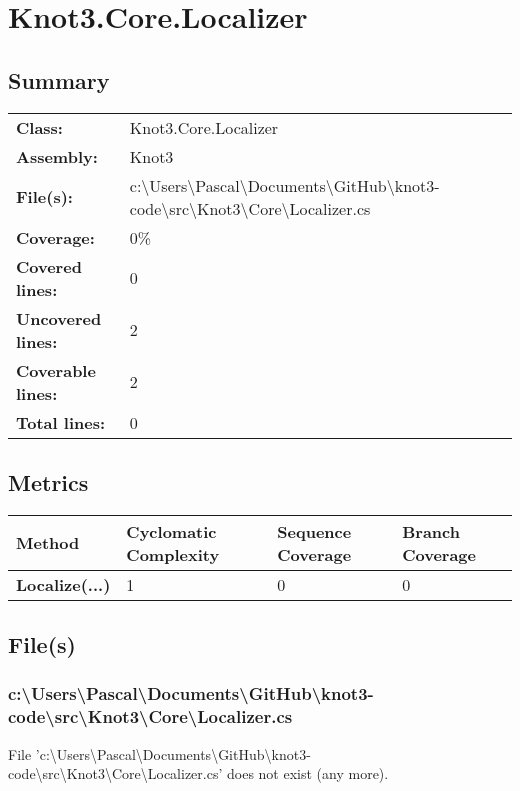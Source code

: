 \documentclass[a4paper,10pt]{article}
\begin{document}
\section{Knot3.Core.Localizer}
\subsection{Summary}
\begin{longtable}[l]{ll}
\textbf{Class:} & Knot3.Core.Localizer\\
\textbf{Assembly:} & Knot3\\
\textbf{File(s):} & \begin{minipage}[t]{12cm}{c:\textbackslash Users\textbackslash Pascal\textbackslash Documents\textbackslash GitHub\textbackslash knot3-code\textbackslash src\textbackslash Knot3\textbackslash Core\textbackslash Localizer.cs}\end{minipage} \\
\textbf{Coverage:} & 0\%\\
\textbf{Covered lines:} & 0\\
\textbf{Uncovered lines:} & 2\\
\textbf{Coverable lines:} & 2\\
\textbf{Total lines:} & 0\\
\end{longtable}
\subsection{Metrics}
\begin{longtable}[l]{|l|l|l|l|}
\hline
\textbf{Method} & \textbf{Cyclomatic Complexity} & \textbf{Sequence Coverage} & \textbf{Branch Coverage}\\
\hline
\textbf{Localize(...)} & 1 & 0 & 0\\
\hline
\end{longtable}
\subsection{File(s)}
\subsubsection{c:\textbackslash Users\textbackslash Pascal\textbackslash Documents\textbackslash GitHub\textbackslash knot3-code\textbackslash src\textbackslash Knot3\textbackslash Core\textbackslash Localizer.cs}
 File 'c:\textbackslash Users\textbackslash Pascal\textbackslash Documents\textbackslash GitHub\textbackslash knot3-code\textbackslash src\textbackslash Knot3\textbackslash Core\textbackslash Localizer.cs' does not exist (any more).
\newpage
\end{document}
